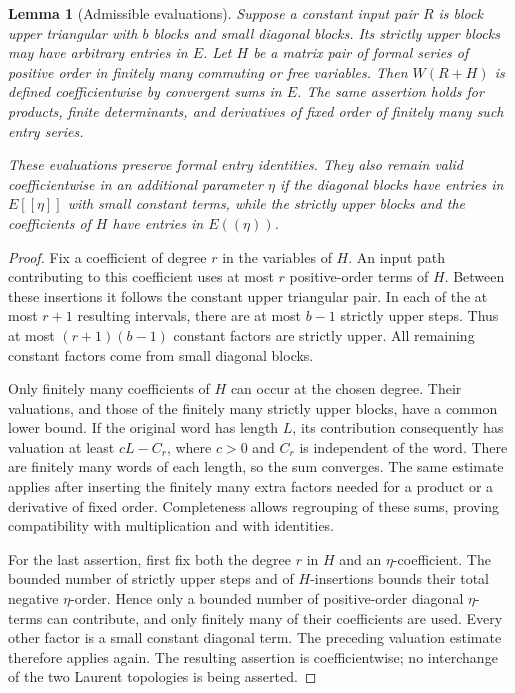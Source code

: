 \documentclass[11pt]{article}
\newtheorem{lemma}[theorem]{Lemma}
\theoremstyle{definition}
\theoremstyle{remark}
\numberwithin{equation}{section}
\begin{document}
\begin{lemma}[Admissible evaluations]\label{lem:admissible-evaluation}
Suppose a constant input pair $R$ is block upper triangular with $b$
blocks and small diagonal blocks.  Its strictly upper blocks may have
arbitrary entries in $E$.  Let $H$ be a matrix pair of formal series
of positive order in finitely many commuting or free variables.
Then $W(R+H)$ is defined coefficientwise by convergent sums in $E$.
The same assertion holds for products, finite determinants, and
derivatives of fixed order of finitely many such entry series.

These evaluations preserve formal entry identities.  They also
remain valid coefficientwise in an additional parameter $\eta$ if
the diagonal blocks have entries in $E[[\eta]]$ with small constant
terms, while the strictly upper blocks and the coefficients of $H$
have entries in $E((\eta))$.
\end{lemma}

\begin{proof}
Fix a coefficient of degree $r$ in the variables of $H$.  An input
path contributing to this coefficient uses at most $r$ positive-order
terms of $H$.  Between these insertions it follows the constant upper
triangular pair.  In each of the at most $r+1$ resulting intervals,
there are at most $b-1$ strictly upper steps.  Thus at most
$(r+1)(b-1)$ constant factors are strictly upper.  All remaining
constant factors come from small diagonal blocks.

Only finitely many coefficients of $H$ can occur at the chosen degree.
Their valuations, and those of the finitely many strictly upper
blocks, have a common lower bound.  If the original word has length
$L$, its contribution consequently has valuation at least
$cL-C_r$, where $c>0$ and $C_r$ is independent of the word.  There
are finitely many words of each length, so the sum converges.  The
same estimate applies after inserting the finitely many extra factors
needed for a product or a derivative of fixed order.  Completeness
allows regrouping of these sums, proving compatibility with
multiplication and with identities.

For the last assertion, first fix both the degree $r$ in $H$ and an
$\eta$-coefficient.  The bounded number of strictly upper steps and
of $H$-insertions bounds their total negative $\eta$-order.  Hence
only a bounded number of positive-order diagonal $\eta$-terms can
contribute, and only finitely many of their coefficients are used.
Every other factor is a small constant diagonal term.  The preceding
valuation estimate therefore applies again.  The resulting assertion
is coefficientwise; no interchange of the two Laurent topologies is
being asserted.
\end{proof}
\end{document}
